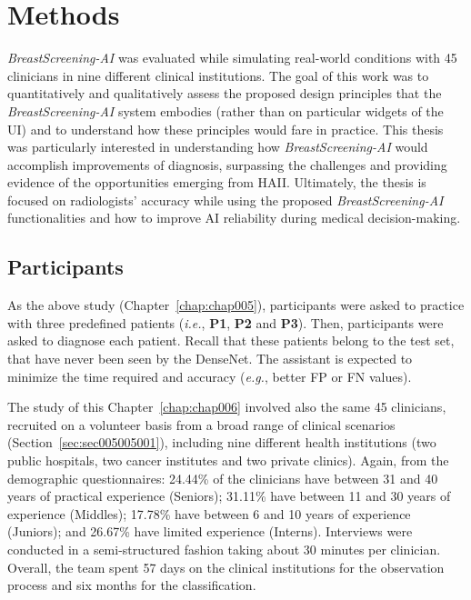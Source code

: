 \section{Methods}
\label{sec:sec006005}

{\it BreastScreening-AI} was evaluated while simulating real-world conditions with 45 clinicians in nine different clinical institutions.
The goal of this work was to quantitatively and qualitatively assess the proposed design principles that the {\it BreastScreening-AI} system embodies (rather than on particular widgets of the \ac{UI}) and to understand how these principles would fare in practice.
This thesis was particularly interested in understanding how {\it BreastScreening-AI} would accomplish improvements of diagnosis, surpassing the challenges and providing evidence of the opportunities emerging from \ac{HAII}.
Ultimately, the thesis is focused on radiologists' accuracy while using the proposed {\it BreastScreening-AI} functionalities and how to improve \ac{AI} reliability during medical decision-making.

\subsection{Participants}
\label{sec:sec006005001}

As the above study (Chapter~\ref{chap:chap005}), participants were asked to practice with three predefined patients ({\it i.e.}, {\bf P1}, {\bf P2} and {\bf P3}).
Then, participants were asked to diagnose each patient.
Recall that these patients belong to the test set, that have never been seen by the DenseNet.
The assistant is expected to minimize the time required and accuracy ({\it e.g.}, better \ac{FP} or \ac{FN} values).

The study of this Chapter~\ref{chap:chap006} involved also the same 45 clinicians, recruited on a volunteer basis from a broad range of clinical scenarios (Section~\ref{sec:sec005005001}), including nine different health institutions (two public hospitals, two cancer institutes and two private clinics).
Again, from the demographic questionnaires:
24.44\% of the clinicians have between 31 and 40 years of practical experience (Seniors);
31.11\% have between 11 and 30 years of experience (Middles);
17.78\% have between 6 and 10 years of experience (Juniors); and
26.67\% have limited experience (Interns).
Interviews were conducted in a semi-structured fashion taking about 30 minutes per clinician.
Overall, the team spent 57 days on the clinical institutions for the observation process and six months for the classification.

